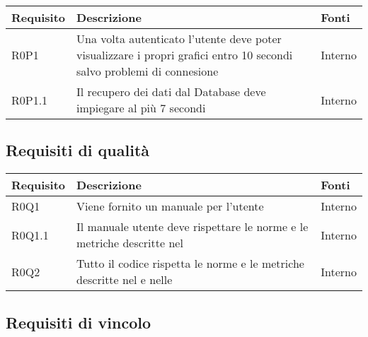\begin{center}

	\def\arraystretch{1.5}
	\bgroup
	\begin{longtable}{| p{2cm} | p{7cm} | p{2cm} |}

		\hline
		\textbf{Requisito} & \textbf{Descrizione} & \textbf{Fonti} \\
		\hline

		R0P1  &  Una volta autenticato l'utente deve poter visualizzare i propri grafici entro 10 secondi salvo problemi di connesione &  Interno \\
		\hline
		R0P1.1  &  Il recupero dei dati dal Database deve impiegare al più 7 secondi  &  Interno \\
		\hline

	\end{longtable}
	\egroup
\end{center}

\subsection{Requisiti di qualità}

\begin{center}

	\def\arraystretch{1.5}
	\bgroup
	\begin{longtable}{| p{2cm} | p{7cm} | p{2cm} |}

		\hline
		\textbf{Requisito} & \textbf{Descrizione} & \textbf{Fonti} \\
		\hline

		R0Q1  &  Viene fornito un manuale per l'utente  &  Interno \\
		\hline
		R0Q1.1  &  Il manuale utente deve rispettare le norme e le metriche descritte nel \docNameVersionPdQ  &  Interno \\
		\hline
		R0Q2  &  Tutto il codice rispetta le norme e le metriche descritte nel \docNameVersionPdQ{} e nelle \docNameVersionNdP &  Interno \\
		\hline


	\end{longtable}
	\egroup
\end{center}

\subsection{Requisiti di vincolo}

